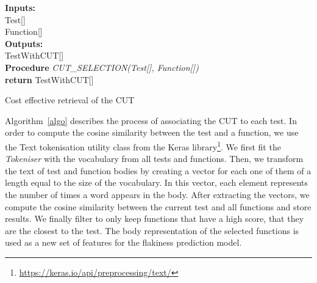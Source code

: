 \begin{algorithm}
\SetAlgoLined
\textbf{Inputs:}\\
Test[]\\
Function[]\\
\textbf{Outputs:}\\
TestWithCUT[]\\
\textbf{Procedure} \emph{CUT\_SELECTION(Test[], Function[])}\\
 \textbf{return} TestWithCUT[]
 \caption{Cost effective retrieval of the CUT}
 \label{algo}
\end{algorithm}

Algorithm~\ref{algo} describes the process of associating the CUT to each test. 
In order to compute the cosine similarity between the test and a function, we use the Text tokenisation utility class from the Keras library\footnote{\url{https://keras.io/api/preprocessing/text/}}. 
We first fit the \emph{Tokeniser} with the vocabulary from all tests and functions. 
Then, we transform the text of test and function bodies by creating a vector for each one of them of a length equal to the size of the vocabulary.
In this vector, each element represents the number of times a word appears in the body. 
After extracting the vectors, we compute the cosine similarity between the current test and all functions and store results. 
We finally filter to only keep functions that have a high score, \ie that they are the closest to the test. 
The body representation of the selected functions is used as a new set of features for the flakiness prediction model.